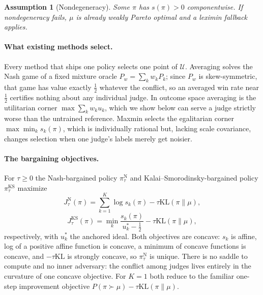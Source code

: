 \documentclass[letterpaper]{article} %
\newtheorem{assumption}{Assumption}
\newcommand{\U}{\mathcal{U}}
\newcommand{\KL}{\mathrm{KL}}
\begin{document}
\begin{assumption}[Nondegeneracy]
\label{ass:nondeg}
Some $\pi$ has $s(\pi)>0$ componentwise. If nondegeneracy fails, $\mu$ is already weakly Pareto optimal and a leximin fallback applies.
\end{assumption}

\paragraph{What existing methods select.}
Every method that ships one policy selects one point of $\U$. Averaging solves the Nash game of a fixed mixture oracle $P_w=\sum_k w_kP_k$; since $P_w$ is skew-symmetric, that game has value exactly $\tfrac12$ whatever the conflict, so an averaged win rate near $\tfrac12$ certifies nothing about any individual judge. In outcome space averaging is the utilitarian corner $\max\sum_k w_ku_k$, which we show below can serve a judge strictly worse than the untrained reference. Maxmin selects the egalitarian corner $\max\min_k s_k(\pi)$, which is individually rational but, lacking scale covariance, changes selection when one judge's labels merely get noisier.

\paragraph{The bargaining objectives.}
For $\tau\ge0$ the Nash-bargained policy $\pi^{\mathrm N}_\tau$ and Kalai--Smorodinsky-bargained policy $\pi^{\mathrm{KS}}_\tau$ maximize
\begin{equation}
J^{\mathrm N}_\tau(\pi)=\sum_{k=1}^{K}\log s_k(\pi)-\tau\KL(\pi\|\mu),
\label{eq:jn}
\end{equation}
\begin{equation}
J^{\mathrm{KS}}_\tau(\pi)=\min_k\frac{s_k(\pi)}{u^\ast_k-\tfrac12}-\tau\KL(\pi\|\mu),
\label{eq:jks}
\end{equation}
respectively, with $u^\ast_k$ the anchored ideal. Both objectives are concave: $s_k$ is affine, log of a positive affine function is concave, a minimum of concave functions is concave, and $-\tau\KL$ is strongly concave, so $\pi^{\mathrm N}_\tau$ is unique. There is no saddle to compute and no inner adversary: the conflict among judges lives entirely in the curvature of one concave objective. For $K=1$ both reduce to the familiar one-step improvement objective $P(\pi\succ\mu)-\tau\KL(\pi\|\mu)$.
\end{document}
